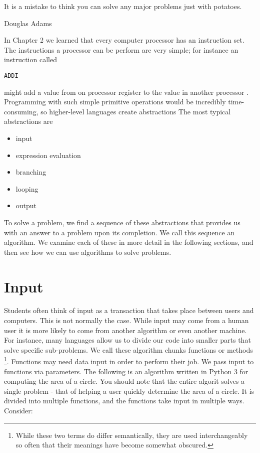 \documentclass[11pt,fleqn]{book} %
\begin{document}
\epigraph{It is a mistake to think you can solve any major problems just with potatoes.}{Douglas Adams}

In Chapter 2 we learned that every computer processor has an \gls{instruction set}.  The instructions a processor can be perform are very simple; for instance an instruction called \begin{verbatim}ADDI\end{verbatim} might add a value from on processor register to the value in another processor . Programming with such simple primitive operations would be incredibly time-consuming, so higher-level languages create \gls{abstraction}s  The most typical abstractions are 

\begin{itemize}
\item input
\item expression evaluation
\item branching
\item looping
\item output
\end{itemize}

To solve a problem, we find a sequence of these abstractions that provides us with an answer to a problem upon its completion.  We call this sequence an \gls{algorithm}.  We examine each of these in more detail in the following sections, and then see how we can use algorithms to solve problems.

\section{Input}

Students often think of input as a transaction that takes place between users and computers.  This is not normally the case.  While input may come from a human user it is more likely to come from another \gls{algorithm} or even another machine.  For instance, many languages allow us to divide our code into smaller parts that solve specific sub-problems.  We call these algorithm chunks \gls{function}s or \gls{method}s \footnote{While these two terms do differ semantically, they are used interchangeably so often that their meanings have become somewhat obscured.}.  Functions may need data input in order to perform their job.  We pass input to functions via \gls{parameters}.  The following is an algorithm written in Python 3 for computing the area of a circle.  You should note that the entire algorit solves a single problem - that of helping a user quickly determine the area of a circle.  It is divided into multiple functions, and the functions take input in multiple ways.  Consider:
\end{document}
